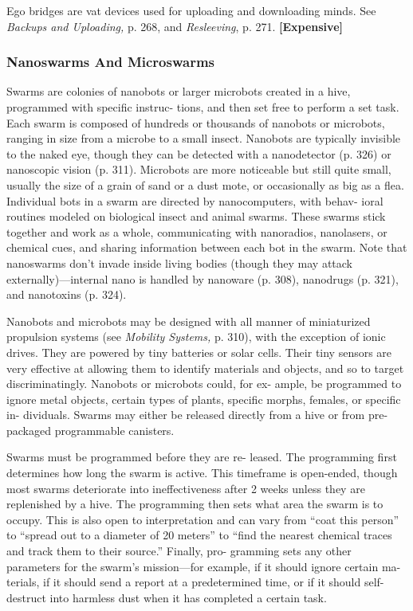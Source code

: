 Ego bridges are vat devices used for uploading and 
downloading minds. See \textit{Backups and Uploading,} p. 268, 
and \textit{Resleeving}, p. 271. \textbf{[Expensive]}

\subsubsection{Nanoswarms And Microswarms}

Swarms are colonies of nanobots or larger microbots 
created in a hive, programmed with specific instruc-
tions, and then set free to perform a set task. Each 
swarm is composed of hundreds or thousands of 
nanobots or microbots, ranging in size from a microbe 
to a small insect. Nanobots are typically invisible to 
the naked eye, though they can be detected with a 
nanodetector (p. 326) or nanoscopic vision (p. 311). 
Microbots are more noticeable but still quite small, 
usually the size of a grain of sand or a dust mote, 
or occasionally as big as a flea. Individual bots in a 
swarm are directed by nanocomputers, with behav-
ioral routines modeled on biological insect and animal 
swarms. These swarms stick together and work as a 
whole, communicating with nanoradios, nanolasers, 
or chemical cues, and sharing information between 
each bot in the swarm. Note that nanoswarms don't 
invade inside living bodies (though they may attack 
externally)—internal nano is handled by nanoware (p. 
308), nanodrugs (p. 321), and nanotoxins (p. 324).

Nanobots and microbots may be designed with 
all manner of miniaturized propulsion systems (see 
\textit{Mobility Systems,} p. 310), with the exception of ionic 
drives. They are powered by tiny batteries or solar 
cells. Their tiny sensors are very effective at allowing 
them to identify materials and objects, and so to target 
discriminatingly. Nanobots or microbots could, for ex-
ample, be programmed to ignore metal objects, certain 
types of plants, specific morphs, females, or specific in-
dividuals. Swarms may either be released directly from 
a hive or from pre-packaged programmable canisters.

Swarms must be programmed before they are re-
leased. The programming first determines how long 
the swarm is active. This timeframe is open-ended, 
though most swarms deteriorate into ineffectiveness 
after 2 weeks unless they are replenished by a hive. 
The programming then sets what area the swarm is 
to occupy. This is also open to interpretation and 
can vary from ``coat this person'' to ``spread out to a 
diameter of 20 meters'' to ``find the nearest chemical 
traces and track them to their source.'' Finally, pro-
gramming sets any other parameters for the swarm's 
mission—for example, if it should ignore certain ma-
terials, if it should send a report at a predetermined 
time, or if it should self-destruct into harmless dust 
when it has completed a certain task.

